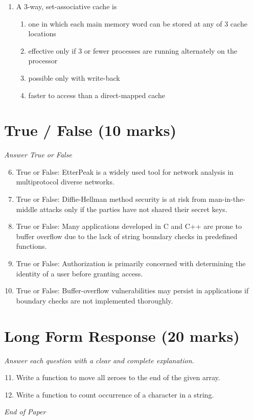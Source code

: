 \documentclass[12pt]{article}
\begin{document}
\begin{enumerate}[label=\arabic*.]
\begin{enumerate}[label=(\alph*)]
    \item Only once
    \item Twice
    \item Multiple times
    \item Conditions dependant
\end{enumerate}
\item A 3-way, set-associative cache is
\begin{enumerate}[label=(\alph*)]
    \item one in which each main memory word can be stored at any of 3 cache locations
    \item effective only if 3 or fewer processes are running alternately on the processor
    \item possible only with write-back
    \item faster to access than a direct-mapped cache
\end{enumerate}
\end{enumerate}

\section*{True / False (10 marks)}
\textit{Answer True or False}
\begin{enumerate}[label=\arabic*.]
\setcounter{enumi}{5}
\item True or False: EtterPeak is a widely used tool for network analysis in multiprotocol diverse networks.
\item True or False: Diffie-Hellman method security is at risk from man-in-the-middle attacks only if the parties have not shared their secret keys.
\item True or False: Many applications developed in C and C++ are prone to buffer overflow due to the lack of string boundary checks in predefined functions.
\item True or False: Authorization is primarily concerned with determining the identity of a user before granting access.
\item True or False: Buffer-overflow vulnerabilities may persist in applications if boundary checks are not implemented thoroughly.
\end{enumerate}

\section*{Long Form Response (20 marks)}
\textit{Answer each question with a clear and complete explanation.}
\begin{enumerate}[label=\arabic*.]
\setcounter{enumi}{10}
\item Write a function to move all zeroes to the end of the given array.
\item Write a function to count occurrence of a character in a string.
\end{enumerate}

\vfill
\noindent\textit{End of Paper}
\end{document}
